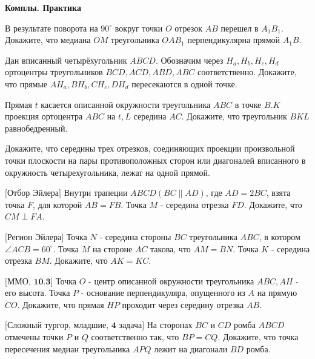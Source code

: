 \centerline{\bf \Huge Комплы. Практика}

\begin{flushright}
        \scriptsize{}
\end{flushright}

В результате поворота на $90^{\circ}$ вокруг точки $O$ отрезок $A B$ перешел в $A_1 B_1$. Докажите, что медиана $O M$ треугольника $O A B_1$ перпендикулярна прямой $A_1 B$.

Дан вписанный четырёхугольник $A B C D$. Обозначим через $H_a, H_b, H_c, H_d$ ортоцентры треугольников $B C D, A C D, A B D, A B C$ соответственно. Докажите, что прямые $A H_a, B H_b, C H_c, D H_d$ пересекаются в одной точке.

Прямая $t$ касается описанной окружности треугольника $A B C$ в точке $B . K$ проекция ортоцентра $A B C$ на $t, L$ середина $A C$. Докажите, что треугольник $B K L$ равнобедренный.

Докажите, что середины трех отрезков, соединяющих проекции произвольной точки плоскости на пары противоположных сторон или диагоналей вписанного в окружность четырехугольника, лежат на одной прямой.

$\bigl[\textbf{Отбор Эйлера}\bigr]$
Внутри трапеции $A B C D(B C \| A D)$, где $A D=2 B C$, взята точка $F$, для которой $A B=F B$. Точка $M$ - середина отрезка $F D$. Докажите, что $C M \perp F A$.

$\bigl[\textbf{Регион Эйлера}\bigr]$
Точка $N$ - середина стороны $B C$ треугольника $A B C$, в котором $\angle A C B=60^{\circ}$. Точка $M$ на стороне $A C$ такова, что $A M=B N$. Точка $K$ - середина отрезка $BM$. Докажите, что $A K=K C$.

$\bigl[\textbf{ММО, 10.3}\bigr]$
Точка $O$ - центр описанной окружности треугольника $A B C, A H$ - его высота. Точка $P$ - основание перпендикуляра, опущенного из $A$ на прямую $C O$. Докажите, что прямая $H P$ проходит через середину отрезка $AB$.

$\bigl[\textbf{Сложный тургор, младшие, 4 задача}\bigr]$
На сторонах $B C$ и $C D$ ромба $A B C D$ отмечены точки $P$ и $Q$ соответственно так, что $B P=C Q$. Докажите, что точка пересечения медиан треугольника $A P Q$ лежит на диагонали $B D$ ромба.